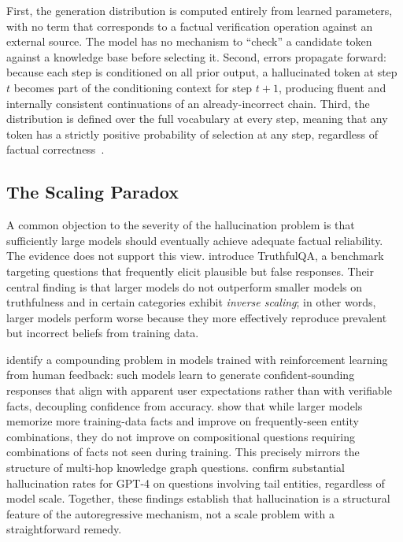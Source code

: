 First, the generation distribution is computed entirely from learned parameters, with no term that corresponds to a factual verification operation against an external source. The model has no mechanism to ``check'' a candidate token against a knowledge base before selecting it. Second, errors propagate forward: because each step is conditioned on all prior output, a hallucinated token at step $t$ becomes part of the conditioning context for step $t{+}1$, producing fluent and internally consistent continuations of an already-incorrect chain. Third, the distribution is defined over the full vocabulary at every step, meaning that any token has a strictly positive probability of selection at any step, regardless of factual correctness~\citep{brown2020gpt3,huang2023hallucination,ji2023survey}.

\subsection{The Scaling Paradox}

A common objection to the severity of the hallucination problem is that sufficiently large models should eventually achieve adequate factual reliability. The evidence does not support this view. \citet{lin2022truthfulqa} introduce TruthfulQA, a benchmark targeting questions that frequently elicit plausible but false responses. Their central finding is that larger models do not outperform smaller models on truthfulness and in certain categories exhibit \textit{inverse scaling}; in other words, larger models perform worse because they more effectively reproduce prevalent but incorrect beliefs from training data.

\citet{perez2022sycophancy} identify a compounding problem in models trained with reinforcement learning from human feedback: such models learn to generate confident-sounding responses that align with apparent user expectations rather than with verifiable facts, decoupling confidence from accuracy. \citet{kandpal2023large} show that while larger models memorize more training-data facts and improve on frequently-seen entity combinations, they do not improve on compositional questions requiring combinations of facts not seen during training. This precisely mirrors the structure of multi-hop knowledge graph questions. \citet{mallen2023not} confirm substantial hallucination rates for GPT-4 on questions involving tail entities, regardless of model scale. Together, these findings establish that hallucination is a structural feature of the autoregressive mechanism, not a scale problem with a straightforward remedy.

